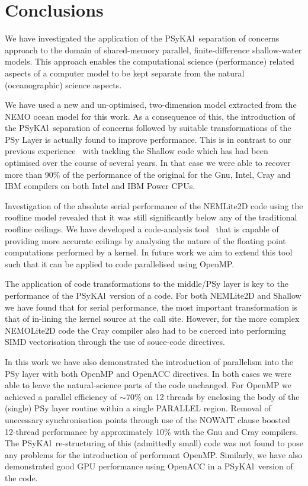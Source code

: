 \documentclass[journal]{IEEEtran}
\newcommand{\psykal}{{PS}y{KA}l}
\begin{document}
\section{Conclusions}

We have investigated the application of the \psykal\ separation of
concerns approach to the domain of shared-memory parallel,
finite-difference shallow-water models. This approach enables the
computational science (performance) related aspects of a computer
model to be kept separate from the natural (oceanographic) science
aspects.

We have used a new and un-optimised, two-dimension model extracted
from the NEMO ocean model for this work. As a consequence of this, the
introduction of the \psykal\ separation of concerns followed by
suitable transformations of the PSy Layer is actually found to improve
performance. This is in contrast to our previous
experience~\cite{shallow_psykal} with tackling the Shallow code which
has had been optimised over the course of several years. In that case
we were able to recover more than 90\% of the performance of the
original for the Gnu, Intel, Cray and IBM compilers on both Intel and
IBM Power CPUs.

Investigation of the absolute serial performance of the NEMLite2D code
using the roofline model revealed that it was still significantly
below any of the traditional roofline ceilings. We have developed a
code-analysis tool~\cite{habakkuk} that is capable of providing more
accurate ceilings by analysing the nature of the floating point
computations performed by a kernel. In future work we aim to extend
this tool such that it can be applied to code parallelised using
OpenMP.

The application of code transformations to the middle/PSy layer is key
to the performance of the \psykal\ version of a code. For both
NEMLite2D and Shallow we have found that for serial performance, the
most important transformation is that of in-lining the kernel source
at the call site. However, for the more complex NEMOLite2D code the
Cray compiler also had to be coerced into performing SIMD
vectorisation through the use of souce-code directives.

In this work we have also demonstrated the introduction of parallelism
into the PSy layer with both OpenMP and OpenACC directives. In both
cases we were able to leave the natural-science parts of the code
unchanged. For OpenMP we achieved a parallel efficiency of $\sim70\%$
on 12 threads by enclosing the body of the (single) PSy layer routine
within a single PARALLEL region. Removal of unecessary synchronisation
points through use of the NOWAIT clause boosted 12-thread performance
by approximately 10\% with the Gnu and Cray compilers. The
\psykal\ re-structuring of this (admittedly small) code was not found
to pose any problems for the introduction of performant OpenMP.
Similarly, we have also demonstrated good GPU performance using OpenACC
in a \psykal\ version of the code.
\end{document}
